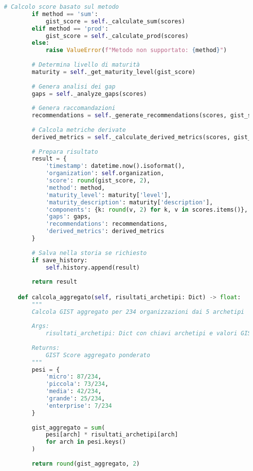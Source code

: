 \begin{lstlisting}[language=Python, caption={Implementazione completa GIST Calculator con validazione e reporting}]
        # Calcolo score basato sul metodo
        if method == 'sum':
            gist_score = self._calculate_sum(scores)
        elif method == 'prod':
            gist_score = self._calculate_prod(scores)
        else:
            raise ValueError(f"Metodo non supportato: {method}")
        
        # Determina livello di maturità
        maturity = self._get_maturity_level(gist_score)
        
        # Genera analisi dei gap
        gaps = self._analyze_gaps(scores)
        
        # Genera raccomandazioni
        recommendations = self._generate_recommendations(scores, gist_score)
        
        # Calcola metriche derivate
        derived_metrics = self._calculate_derived_metrics(scores, gist_score)
        
        # Prepara risultato
        result = {
            'timestamp': datetime.now().isoformat(),
            'organization': self.organization,
            'score': round(gist_score, 2),
            'method': method,
            'maturity_level': maturity['level'],
            'maturity_description': maturity['description'],
            'components': {k: round(v, 2) for k, v in scores.items()},
            'gaps': gaps,
            'recommendations': recommendations,
            'derived_metrics': derived_metrics
        }
        
        # Salva nella storia se richiesto
        if save_history:
            self.history.append(result)
        
        return result

    def calcola_aggregato(self, risultati_archetipi: Dict) -> float:
        """
        Calcola GIST aggregato per 234 organizzazioni dai 5 archetipi
        
        Args:
            risultati_archetipi: Dict con chiavi archetipi e valori GIST
            
        Returns:
            GIST Score aggregato ponderato
        """
        pesi = {
            'micro': 87/234,
            'piccola': 73/234,
            'media': 42/234,
            'grande': 25/234,
            'enterprise': 7/234
        }
        
        gist_aggregato = sum(
            pesi[arch] * risultati_archetipi[arch]
            for arch in pesi.keys()
        )
        
        return round(gist_aggregato, 2)
    

\end{lstlisting}

